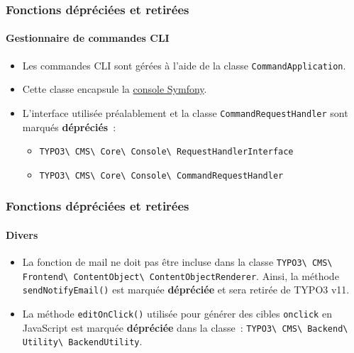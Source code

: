 \begin{frame}[fragile]
	\frametitle{Fonctions dépréciées et retirées}
	\framesubtitle{Gestionnaire de commandes CLI}

	\begin{itemize}
		\item Les commandes CLI sont gérées à l'aide de la classe \texttt{CommandApplication}.
		\item Cette classe encapsule la
			\href{https://symfony.com/doc/current/components/console.html}{console Symfony}.

		\item L'interface utilisée préalablement et la classe \texttt{CommandRequestHandler}
			sont marqués \textbf{dépréciés}~:

			\begin{itemize}
				\item
					\texttt{TYPO3\textbackslash
						CMS\textbackslash
						Core\textbackslash
						Console\textbackslash
						RequestHandlerInterface}
				\item
					\texttt{TYPO3\textbackslash
						CMS\textbackslash
						Core\textbackslash
						Console\textbackslash
						CommandRequestHandler}
			\end{itemize}

	\end{itemize}

\end{frame}


\begin{frame}[fragile]
	\frametitle{Fonctions dépréciées et retirées}
	\framesubtitle{Divers}

	\begin{itemize}
		\item La fonction de mail ne doit pas être incluse dans la classe\newline
			\small
				\texttt{TYPO3\textbackslash
					CMS\textbackslash
					Frontend\textbackslash
					ContentObject\textbackslash
					ContentObjectRenderer}.\newline
			\normalsize
			Ainsi, la méthode \texttt{sendNotifyEmail()} est marquée \textbf{dépréciée} et sera retirée de TYPO3 v11.

		\item La méthode \texttt{editOnClick()} utilisée pour générer des cibles \texttt{onclick}
			en JavaScript est marquée \textbf{dépréciée} dans la classe~:\newline
			\small
				\texttt{TYPO3\textbackslash
					CMS\textbackslash
					Backend\textbackslash
					Utility\textbackslash
					BackendUtility}.
			\normalsize

	\end{itemize}

\end{frame}

